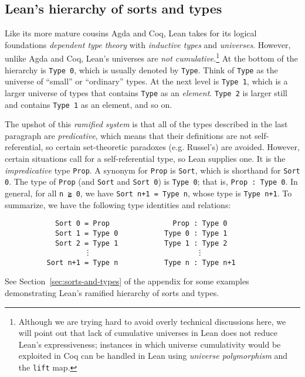 \documentclass[11pt]{amsart}  %
\begin{document}
\subsection{Lean's hierarchy of sorts and types}
\label{sec:leans-hierarchy-of-sorts-and-types}
Like its more mature cousins Agda and Coq, Lean takes for its logical foundations \emph{dependent type theory} with \emph{inductive types} and \emph{universes}. However, unlike Agda and Coq, Lean's universes are \emph{not cumulative}.\footnote{Although we are trying hard to avoid overly technical discussions here, we will point out that lack of cumulative universes in Lean does not reduce Lean's expressiveness; instances in which universe cumulativity would be exploited in Coq can be handled in Lean using \emph{universe polymorphism} and the \lstinline{lift} map.}
At the bottom of the hierarchy is \lstinline{Type 0}, which is usually denoted by \lstinline{Type}.
Think of  \lstinline{Type} as the universe of ``small'' or ``ordinary'' types.  At the next level is \lstinline{Type 1}, which is a larger universe of types that contains \lstinline{Type} as an \emph{element}. \lstinline{Type 2} is  larger still and contains  \lstinline{Type 1} as an element, and so on. 

The upshot of this \emph{ramified system} is that all of the types described in the last paragraph are \emph{predicative}, which means that their definitions are not self-referential, so certain set-theoretic paradoxes (e.g. Russel's) are avoided. However, certain situations call for a self-referential type, so Lean supplies one. It is the \emph{impredicative} type \lstinline{Prop}.
A synonym for \lstinline{Prop} is \lstinline{Sort}, which is shorthand for \lstinline{Sort 0}. The type of \lstinline{Prop} (and \lstinline{Sort} and  \lstinline{Sort 0}) is \lstinline{Type 0}; that is, \lstinline{Prop : Type 0}. In general, for all \lstinline{n ≧ 0}, 
we have 
\lstinline{Sort n+1 = Type n}, whose type is \lstinline{Type n+1}. 
To summarize, we have the following type identities and relations:
\begin{lstlisting}
            Sort 0 = Prop               Prop : Type 0
            Sort 1 = Type 0           Type 0 : Type 1
            Sort 2 = Type 1           Type 1 : Type 2
                   ⋮                         ⋮
          Sort n+1 = Type n           Type n : Type n+1
\end{lstlisting}
See Section~\ref{sec:sorts-and-types} of the appendix for some examples 
demonstrating Lean's ramified hierarchy of sorts and types.
\end{document}
